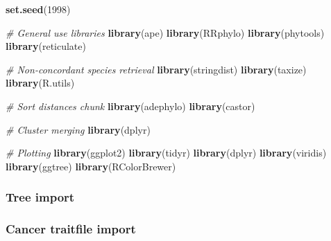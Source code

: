 \documentclass[
]{article}
\newenvironment{Shaded}{\begin{snugshade}}{\end{snugshade}}
\newcommand{\CommentTok}[1]{\textcolor[rgb]{0.56,0.35,0.01}{\textit{#1}}}
\newcommand{\DecValTok}[1]{\textcolor[rgb]{0.00,0.00,0.81}{#1}}
\newcommand{\FunctionTok}[1]{\textcolor[rgb]{0.13,0.29,0.53}{\textbf{#1}}}
\newcommand{\NormalTok}[1]{#1}
\newcommand{\OtherTok}[1]{\textcolor[rgb]{0.56,0.35,0.01}{#1}}
\newcommand{\SpecialCharTok}[1]{\textcolor[rgb]{0.81,0.36,0.00}{\textbf{#1}}}
\newcommand{\StringTok}[1]{\textcolor[rgb]{0.31,0.60,0.02}{#1}}
\begin{document}
\begin{Shaded}
\begin{Highlighting}[]
\FunctionTok{set.seed}\NormalTok{(}\DecValTok{1998}\NormalTok{)}

\CommentTok{\# General use libraries}
\FunctionTok{library}\NormalTok{(ape)}
\FunctionTok{library}\NormalTok{(RRphylo)}
\FunctionTok{library}\NormalTok{(phytools)}
\FunctionTok{library}\NormalTok{(reticulate)}

\CommentTok{\# Non{-}concordant species retrieval }
\FunctionTok{library}\NormalTok{(stringdist)}
\FunctionTok{library}\NormalTok{(taxize)}
\FunctionTok{library}\NormalTok{(R.utils)}

\CommentTok{\# Sort distances chunk}
\FunctionTok{library}\NormalTok{(adephylo)}
\FunctionTok{library}\NormalTok{(castor)}

\CommentTok{\# Cluster merging}
\FunctionTok{library}\NormalTok{(dplyr)}

\CommentTok{\# Plotting}
\FunctionTok{library}\NormalTok{(ggplot2)}
\FunctionTok{library}\NormalTok{(tidyr)}
\FunctionTok{library}\NormalTok{(dplyr)}
\FunctionTok{library}\NormalTok{(viridis)}
\FunctionTok{library}\NormalTok{(ggtree)}
\FunctionTok{library}\NormalTok{(RColorBrewer)}
\end{Highlighting}
\end{Shaded}

\hypertarget{tree-import}{%
\subsubsection{Tree import}\label{tree-import}}

\begin{Shaded}
\end{Shaded}

\hypertarget{cancer-traitfile-import}{%
\subsubsection{Cancer traitfile import}\label{cancer-traitfile-import}}
\end{document}
